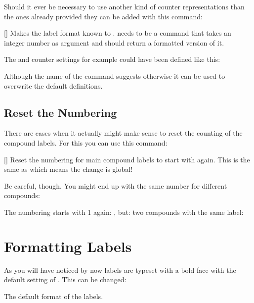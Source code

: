 \documentclass[load-preamble+,babel-options={ngerman,british,american}]{cnltx-doc}
\begin{document}
Should it ever be necessary to use another kind of counter representations
than the ones already provided they can be added with this command:
\begin{commands}
  []
    Makes the label format  known to \chemnum.  
    needs to be a command that takes an integer number as argument and should
    return a formatted version of it.
\end{commands}
The  and  counter settings for example could have been
defined like this:
\begin{sourcecode}
  \makeatletter
    {\@alph}
  \makeatother
\end{sourcecode}
Although the name of the command suggests otherwise it can be used to
overwrite the default definitions.

\subsection{Reset the Numbering}\label{sec:reset-numbering}

There are cases when it actually might make sense to reset the counting of the
compound labels.  For this you can use this command:
\begin{commands}
  []
    Reset the numbering for main compound labels to start with 
    again.  This is the same as
     which
    means the change is global!
\end{commands}

Be careful, though.  You might end up with the same number for different
compounds:
\begin{example}
   \resetcmpd The numbering starts with 1 again: , but:
    two compounds with the same label: 
\end{example}

\section{Formatting Labels}\label{sec:formatting-labels}

As you will have noticed by now labels are typeset with a bold face with the
default setting of \chemnum.  This can be changed:
\begin{options}
    The default format of the labels.
\end{options}
\end{document}
